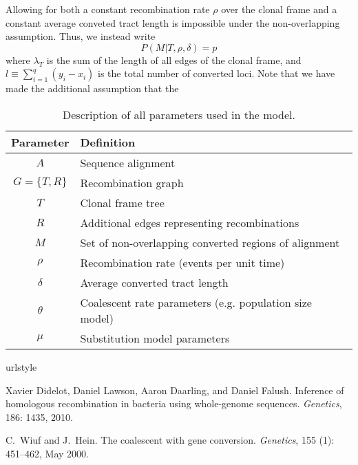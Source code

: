 \documentclass[a4paper,10pt]{article}
\begin{document}
Allowing for both a constant recombination rate $\rho$ over the clonal
frame and a constant average conveted tract length is impossible under
the non-overlapping assumption.  Thus, we instead write
\begin{equation}
P(M|T,\rho,\delta) = p
\end{equation}
where $\lambda_T$ is the sum of the length of all edges of the clonal
frame, and $l\equiv\sum_{i=1}^q (y_i-x_i)$ is the total number of
converted loci. Note that we have made the additional assumption that
the 

\begin{table}
\begin{tabular}{|cl|}
  \hline
  Parameter & Definition \\
  \hline
  $A$ & Sequence alignment \\
  $G=\{T,R\}$ & Recombination graph \\
  $T$ & Clonal frame tree \\
  $R$ & Additional edges representing recombinations \\
  $M$ & Set of non-overlapping converted regions of alignment \\
  $\rho$ & Recombination rate (events per unit time) \\
  $\delta$ & Average converted tract length \\
  $\theta$ & Coalescent rate parameters (e.g. population size model) \\
  $\mu$ & Substitution model parameters \\
  \hline
\end{tabular}
\caption{Description of all parameters used in the model.}
\end{table}

%
%

\begin{thebibliography}{2}
\providecommand{\natexlab}[1]{#1}
\providecommand{\url}[1]{\texttt{#1}}
\expandafter\ifx\csname urlstyle\endcsname\relax
  \providecommand{\doi}[1]{doi: #1}\else
  \providecommand{\doi}{doi: \begingroup \urlstyle{rm}\Url}\fi

Xavier Didelot, Daniel Lawson, Aaron Daarling, and Daniel Falush.
\newblock Inference of homologous recombination in bacteria using whole-genome
  sequences.
\newblock \emph{Genetics}, 186: 1435, 2010.

C.~Wiuf and J.~Hein.
\newblock The coalescent with gene conversion.
\newblock \emph{Genetics}, 155 (1): 451--462, May 2000.

\end{thebibliography}
\end{document}
